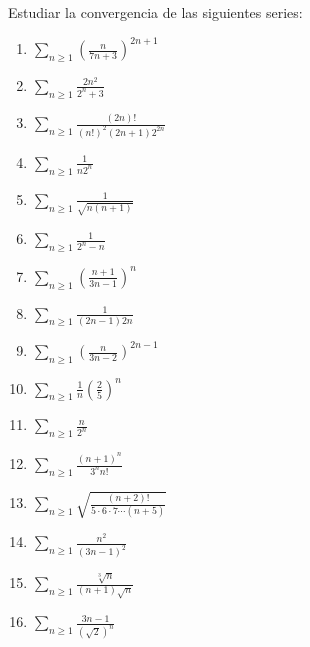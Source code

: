 \begin{ejercicio}
    Estudiar la convergencia de las siguientes series:
    \begin{enumerate}
        \item $\displaystyle\sum_{n \geq 1} \left( \frac{n}{7n+3} \right)^{2n+1}$

        \item $\displaystyle\sum_{n \geq 1} \frac{2n^2}{2^n+3}$

        \item $\displaystyle\sum_{n \geq 1} \frac{(2n)!}{(n!)^2 (2n+1) 2^{2n}}$

        \item $\displaystyle\sum_{n \geq 1} \frac{1}{n 2^n}$

        \item $\displaystyle\sum_{n \geq 1} \frac{1}{\sqrt{n(n+1)}}$

        \item $\displaystyle\sum_{n \geq 1} \frac{1}{2^n-n}$

        \item $\displaystyle\sum_{n \geq 1} \left( \frac{n+1}{3n-1}\right)^n$

        \item $\displaystyle\sum_{n \geq 1} \frac{1}{(2n-1)2n}$

        \item $\displaystyle\sum_{n \geq 1} \left( \frac{n}{3n-2} \right)^{2n-1}$

        \item $\displaystyle\sum_{n \geq 1} \frac{1}{n} \left(\frac{2}{5}\right)^n$

        \item $\displaystyle\sum_{n \geq 1} \frac{n}{2^n}$

        \item $\displaystyle\sum_{n \geq 1} \frac{(n+1)^n}{3^n n!}$

        \item $\displaystyle\sum_{n \geq 1} \sqrt{\frac{(n+2)!}{5 \cdot 6 \cdot 7 \cdots (n+5)}}$

        \item $\displaystyle\sum_{n \geq 1} \frac{n^2}{(3n-1)^2}$

        \item $\displaystyle \sum_{n \geq 1} \frac{\sqrt[3]{n}}{(n+1) \sqrt{n}}$

        \item $\displaystyle\sum_{n \geq 1} \frac{3n-1}{(\sqrt{2})^n}$


\end{enumerate}
\end{ejercicio}
